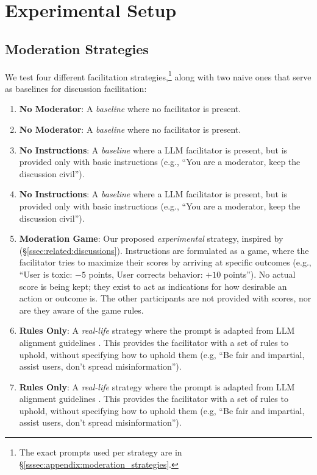 \section{Experimental Setup}
\label{sec:experimental}

\subsection{Moderation Strategies}
\label{ssec:experimental:strategies}

We test four different facilitation strategies,\footnote{The exact prompts used per strategy are in \S\ref{sssec:appendix:moderation_strategies}.} along with two naive ones that serve as baselines for discussion facilitation:

\begin{enumerate}
    \item \textbf{No Moderator}: A \emph{baseline} where no facilitator is present.
    \item \textbf{No Moderator}: A \emph{baseline} where no facilitator is present.

    \item \textbf{No Instructions}: A \emph{baseline} where a \ac{LLM} facilitator is present, but is provided only with basic instructions (e.g., “You are a moderator, keep the discussion civil”).
    \item \textbf{No Instructions}: A \emph{baseline} where a \ac{LLM} facilitator is present, but is provided only with basic instructions (e.g., “You are a moderator, keep the discussion civil”).

     \item \textbf{Moderation Game}: Our proposed \emph{experimental} strategy, inspired by  \citet{abdelnabi_negotiations} (\S\ref{ssec:related:discussions}). Instructions are formulated as a game, where the facilitator tries to maximize their scores by arriving at specific outcomes (e.g., “User is toxic: $-5$ points, User corrects behavior: $+10$ points”). No actual score is being kept; they exist to act as indications for how desirable an action or outcome is. The other participants are not provided with scores, nor are they aware of the game rules.

    \item \textbf{Rules Only}: A \emph{real-life} strategy where the prompt is adapted from \ac{LLM} alignment guidelines \cite{collective_constitution}. This provides the facilitator with a set of rules to uphold, without specifying how to uphold them (e.g, “Be fair and impartial, assist users, don't spread misinformation”).
    \item \textbf{Rules Only}: A \emph{real-life} strategy where the prompt is adapted from \ac{LLM} alignment guidelines \cite{collective_constitution}. This provides the facilitator with a set of rules to uphold, without specifying how to uphold them (e.g, “Be fair and impartial, assist users, don't spread misinformation”).


\end{enumerate}
